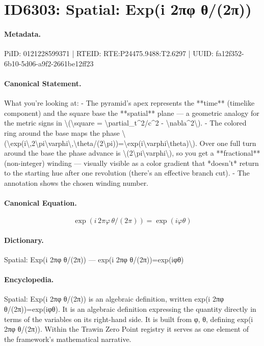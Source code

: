 \section*{ID6303: Spatial: Exp(i 2πφ θ/(2π))}
\paragraph{Metadata.}
PiID: 0121228599371 | RTEID: RTE:P24475.9488:T2.6297 | UUID: fa12f352-6b10-5d06-a9f2-2661be12ff23

\paragraph{Canonical Statement.}
What you’re looking at: - The pyramid’s apex represents the **time** (timelike component) and the square base the **spatial** plane — a geometric analogy for the metric signs in \textbackslash{}(\textbackslash{}square = \textbackslash{}partial\_t\textasciicircum{}2/c\textasciicircum{}2 - \textbackslash{}nabla\textasciicircum{}2\textbackslash{}). - The colored ring around the base maps the phase \textbackslash{}(\textbackslash{}exp(i\textbackslash{},2\textbackslash{}pi\textbackslash{}varphi\textbackslash{},\textbackslash{}theta/(2\textbackslash{}pi))=\textbackslash{}exp(i\textbackslash{}varphi\textbackslash{}theta)\textbackslash{}). Over one full turn around the base the phase advance is \textbackslash{}(2\textbackslash{}pi\textbackslash{}varphi\textbackslash{}), so you get a **fractional** (non-integer) winding — visually visible as a color gradient that *doesn’t* return to the starting hue after one revolution (there’s an effective branch cut). - The annotation shows the chosen winding number.

\paragraph{Canonical Equation.}
\[
\exp(i\,2\pi\varphi\,\theta/(2\pi))=\exp(i\varphi\theta)
\]

\paragraph{Dictionary.}
Spatial: Exp(i 2πφ θ/(2π)) — exp(i 2πφ θ/(2π))=exp(iφθ)

\paragraph{Encyclopedia.}
Spatial: Exp(i 2πφ θ/(2π)) is an algebraic definition, written exp(i 2πφ θ/(2π))=exp(iφθ). It is an algebraic definition expressing the quantity directly in terms of the variables on its right-hand side. It is built from φ, θ, defining exp(i 2πφ θ/(2π)). Within the Trawin Zero Point registry it serves as one element of the framework's mathematical narrative.
